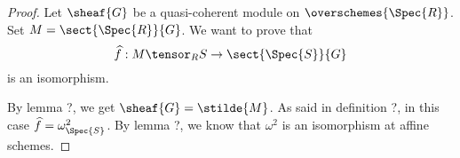 \begin{proof}
Let $\sheaf{G}$ be a quasi-coherent module on $\overschemes{\Spec{R}}$.
Set $M = \sect{\Spec{R}}{G}$.
We want to prove that 
\[
\widehat{f}:M \tensor_{R} S \rightarrow \sect{\Spec{S}}{G}
\]
is an isomorphism.

By lemma ?, we get $\sheaf{G} = \stilde{M}$.
As said in definition ?, in this case $\widehat{f} = \omega^2_{\Spec{S}}$.
By lemma ?, we know that $\omega^2$ is an isomorphism at affine schemes.
\end{proof}

